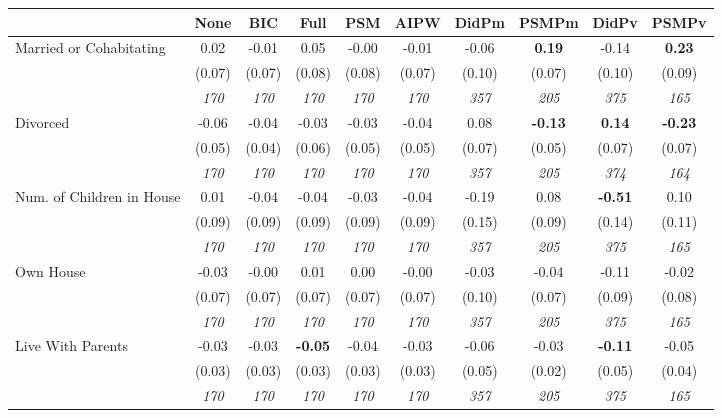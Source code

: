 \begin{tabular}{l c c c c c c c c c}
\toprule
 & None & BIC & Full & PSM & AIPW & DidPm & PSMPm & DidPv & PSMPv \\
\midrule
Married or Cohabitating & 0.02 & -0.01 & 0.05 & -0.00 & -0.01 & -0.06 & \textbf{0.19} & -0.14 & \textbf{0.23} \\
& (0.07) & (0.07) & (0.08) & (0.08) & (0.07) & (0.10) & (0.07) & (0.10) & (0.09) \\
& \textit{ 170 } & \textit{ 170 } & \textit{ 170 } & \textit{ 170 } & \textit{ 170 } & \textit{ 357 } & \textit{ 205 } & \textit{ 375 } & \textit{ 165 } \\
Divorced & -0.06 & -0.04 & -0.03 & -0.03 & -0.04 & 0.08 & \textbf{-0.13} & \textbf{ 0.14 } & \textbf{-0.23} \\
& (0.05) & (0.04) & (0.06) & (0.05) & (0.05) & (0.07) & (0.05) & (0.07) & (0.07) \\
& \textit{ 170 } & \textit{ 170 } & \textit{ 170 } & \textit{ 170 } & \textit{ 170 } & \textit{ 357 } & \textit{ 205 } & \textit{ 374 } & \textit{ 164 } \\
Num. of Children in House & 0.01 & -0.04 & -0.04 & -0.03 & -0.04 & -0.19 & 0.08 & \textbf{ -0.51 } & 0.10 \\
& (0.09) & (0.09) & (0.09) & (0.09) & (0.09) & (0.15) & (0.09) & (0.14) & (0.11) \\
& \textit{ 170 } & \textit{ 170 } & \textit{ 170 } & \textit{ 170 } & \textit{ 170 } & \textit{ 357 } & \textit{ 205 } & \textit{ 375 } & \textit{ 165 } \\
Own House & -0.03 & -0.00 & 0.01 & 0.00 & -0.00 & -0.03 & -0.04 & -0.11 & -0.02 \\
& (0.07) & (0.07) & (0.07) & (0.07) & (0.07) & (0.10) & (0.07) & (0.09) & (0.08) \\
& \textit{ 170 } & \textit{ 170 } & \textit{ 170 } & \textit{ 170 } & \textit{ 170 } & \textit{ 357 } & \textit{ 205 } & \textit{ 375 } & \textit{ 165 } \\
Live With Parents & -0.03 & -0.03 & \textbf{ -0.05 } & -0.04 & -0.03 & -0.06 & -0.03 & \textbf{ -0.11 } & -0.05 \\
& (0.03) & (0.03) & (0.03) & (0.03) & (0.03) & (0.05) & (0.02) & (0.05) & (0.04) \\
& \textit{ 170 } & \textit{ 170 } & \textit{ 170 } & \textit{ 170 } & \textit{ 170 } & \textit{ 357 } & \textit{ 205 } & \textit{ 375 } & \textit{ 165 } \\
\bottomrule
\end{tabular}
